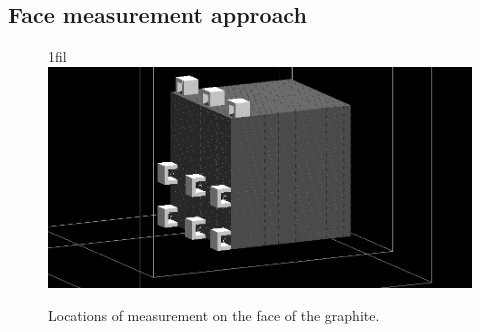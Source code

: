 \documentclass{article}
\makeatletter
\newcommand*{\centerfloat}{%
  \parindent \z@
  \leftskip \z@ \@plus 1fil \@minus \textwidth
  \rightskip\leftskip
  \parfillskip \z@skip}
\makeatother
\begin{document}
\subsection{Face measurement approach}


\begin{figure}
	\centerfloat
	\includegraphics[width=\columnwidth]{images/FaceApproach}
	\caption{Locations of measurement on the face of the graphite.}	
	\label{fig:FaceImage}
\end{figure}







\clearpage
	
	
\end{document}
